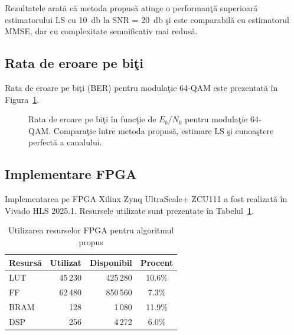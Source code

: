 \documentclass[12pt,a4paper]{article}
\begin{document}
Rezultatele arată că metoda propusă atinge o performanţă superioară
estimatorului LS cu \SI{10}{\decibel} la SNR = \SI{20}{\decibel} şi
este comparabilă cu estimatorul MMSE, dar cu complexitate
semnificativ mai redusă.

\subsection{Rata de eroare pe biţi}

Rata de eroare pe biţi (BER) pentru modulaţie 64-QAM este prezentată
în Figura~\ref{fig:ber}.

\begin{figure}[ht]
\centering
{}
\caption{Rata de eroare pe biţi în funcţie de $E_b/N_0$ pentru modulaţie 64-QAM.
Comparaţie între metoda propusă, estimare LS şi cunoaştere perfectă a canalului.}
\label{fig:ber}
\end{figure}

\subsection{Implementare FPGA}

Implementarea pe FPGA Xilinx Zynq UltraScale+ ZCU111 a fost realizată
în Vivado HLS 2025.1. Resursele utilizate sunt prezentate în
Tabelul~\ref{tab:fpga}.

\begin{table}[ht]
\centering
\caption{Utilizarea resurselor FPGA pentru algoritmul propus}
\label{tab:fpga}
\begin{tabular}{lrrc}
\toprule
Resursă & Utilizat & Disponibil & Procent \\
\midrule
LUT & 45\,230 & 425\,280 & 10.6\% \\
FF & 62\,480 & 850\,560 & 7.3\% \\
BRAM & 128 & 1\,080 & 11.9\% \\
DSP & 256 & 4\,272 & 6.0\% \\
\bottomrule
\end{tabular}
\end{table}
\end{document}
